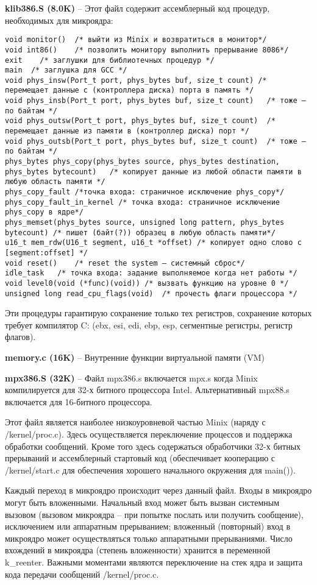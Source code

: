 \textbf{klib386.S (8.0K)} -- Этот файл содержит ассемблерный код процедур, необходимых для микроядра:
\begin{Verbatim}[frame=single]
void monitor()	/* выйти из Minix и возвратиться в монитор*/
void int86()	/* позволить монитору выполнить прерывание 8086*/
exit	/* заглушки для библиотечных процедур */
main  /* заглушка для GCC */
void phys_insw(Port_t port, phys_bytes buf, size_t count) /* перемещает данные с (контроллера диска) порта в память */
void phys_insb(Port_t port, phys_bytes buf, size_t count)	/* тоже – по байтам */
void phys_outsw(Port_t port, phys_bytes buf, size_t count)	/* перемещает данные из памяти в (контроллер диска) порт */
void phys_outsb(Port_t port, phys_bytes buf, size_t count)	/* тоже – по байтам */
phys_bytes phys_copy(phys_bytes source, phys_bytes destination, phys_bytes bytecount)	/* копирует данные из любой области памяти в любую область памяти */
phys_copy_fault /*точка входа: страничное исключение phys_copy*/
phys_copy_fault_in_kernel /* точка входа: страничное исключение phys_copy в ядре*/
phys_memset(phys_bytes source, unsigned long pattern, phys_bytes bytecount)	/* пишет (байт(?)) образец в любую область памяти*/
u16_t mem_rdw(U16_t segment, u16_t *offset)	/* копирует одно слово с [segment:offset] */
void reset()	/* reset the system – системный сброс*/
idle_task	/* точка входа: задание выполняемое когда нет работы */
void level0(void (*func)(void))	/* вызвать функцию на уровне 0 */
unsigned long read_cpu_flags(void)	/* прочесть флаги процессора */
\end{Verbatim}

Эти процедуры гарантирую сохранение только тех регистров, сохранение которых требует компилятор C: (ebx, esi, edi, ebp, esp, сегментные регистры, регистр флагов).

\textbf{memory.c (16K)} -- Внутренние функции виртуальной памяти (VM)

\textbf{mpx386.S (32K)} -- Файл mpx386.s включается mpx.s когда Minix компилируется для 32-х битного процессора Intel. Альтернативный mpx88.s включается для 16-битного процессора.

Этот файл является наиболее низкоуровневой частью Minix (наряду с /kernel/proc.c). Здесь осуществляется переключение процессов и поддержка обработки сообщений. Кроме того здесь содержаться обработчики 32-х битных прерываний и ассемблерный стартовый код (обеспечивает кооперацию с /kernel/start.c для обеспечения хорошего начального окружения для main()).

Каждый переход в микроядро происходит через данный файл. Входы в микроядро могут быть вложенными. Начальный вход может быть вызван системным вызовом (вызовом микроядра -- при попытке послать или получить сообщение), исключением или аппаратным прерыванием; вложенный (повторный) вход в микроядро может осуществляться только аппаратными прерываниями. Число вхождений в микроядра (степень вложенности) хранится в переменной k\_reenter. Важными моментами являются переключение на стек ядра и защита кода передачи сообщений /kernel/proc.c.

